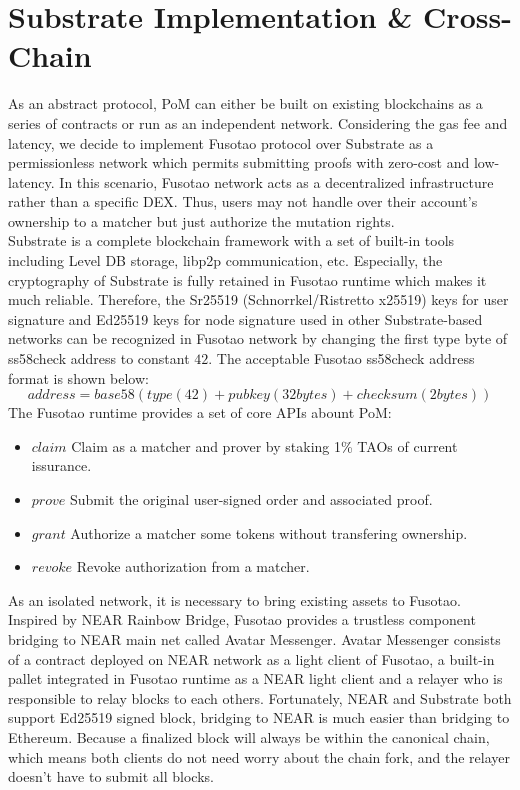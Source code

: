 \documentclass[a4paper,12pt]{article}
\begin{document}
\section{Substrate Implementation \& Cross-Chain}
\label{sec:orge2652f5}
As an abstract protocol, PoM can either be built on existing blockchains as a series of contracts or run as an independent network. Considering the gas fee and latency, we decide to implement Fusotao protocol over Substrate as a permissionless network which permits submitting proofs with zero-cost and low-latency. In this scenario, Fusotao network acts as a decentralized infrastructure rather than a specific DEX. Thus, users may not handle over their account’s ownership to a matcher but just authorize the mutation rights.\\
Substrate is a complete blockchain framework with a set of built-in tools including Level DB storage, libp2p communication, etc. Especially, the cryptography of Substrate is fully retained in Fusotao runtime which makes it much reliable. Therefore, the Sr25519 (Schnorrkel/Ristretto x25519) keys for user signature and Ed25519 keys for node signature used in other Substrate-based networks can be recognized in Fusotao network by changing the first type byte of ss58check address to constant \(42\). The acceptable Fusotao ss58check address format is shown below:\\
\begin{equation*}
address = base58(type(42)+pubkey(32 bytes)+checksum(2 bytes))
\end{equation*}
The Fusotao runtime provides a set of core APIs abount PoM:\\
\begin{itemize}
    \item $claim$ Claim as a matcher and prover by staking 1\% TAOs of current issurance.
    \item $prove$ Submit the original user-signed order and associated proof.
    \item $grant$ Authorize a matcher some tokens without transfering ownership.
    \item $revoke$ Revoke authorization from a matcher.
\end{itemize}
As an isolated network, it is necessary to bring existing assets to Fusotao. Inspired by NEAR Rainbow Bridge, Fusotao provides a trustless component bridging to NEAR main net called Avatar Messenger. Avatar Messenger consists of a contract deployed on NEAR network as a light client of Fusotao, a built-in pallet integrated in Fusotao runtime as a NEAR light client and a relayer who is responsible to relay blocks to each others. Fortunately, NEAR and Substrate both support Ed25519 signed block, bridging to NEAR is much easier than bridging to Ethereum. Because a finalized block will always be within the canonical chain, which means both clients do not need worry about the chain fork, and the relayer doesn’t have to submit all blocks.\\
\end{document}
